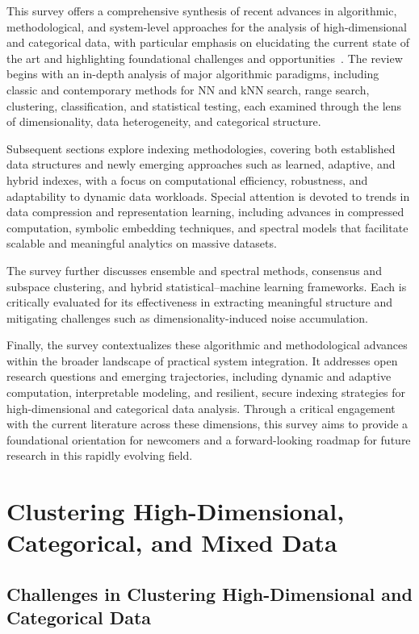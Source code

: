 This survey offers a comprehensive synthesis of recent advances in algorithmic, methodological, and system-level approaches for the analysis of high-dimensional and categorical data, with particular emphasis on elucidating the current state of the art and highlighting foundational challenges and opportunities~\cite{ref116,ref117,ref118}. The review begins with an in-depth analysis of major algorithmic paradigms, including classic and contemporary methods for NN and kNN search, range search, clustering, classification, and statistical testing, each examined through the lens of dimensionality, data heterogeneity, and categorical structure.

Subsequent sections explore indexing methodologies, covering both established data structures and newly emerging approaches such as learned, adaptive, and hybrid indexes, with a focus on computational efficiency, robustness, and adaptability to dynamic data workloads. Special attention is devoted to trends in data compression and representation learning, including advances in compressed computation, symbolic embedding techniques, and spectral models that facilitate scalable and meaningful analytics on massive datasets.

The survey further discusses ensemble and spectral methods, consensus and subspace clustering, and hybrid statistical--machine learning frameworks. Each is critically evaluated for its effectiveness in extracting meaningful structure and mitigating challenges such as dimensionality-induced noise accumulation.

Finally, the survey contextualizes these algorithmic and methodological advances within the broader landscape of practical system integration. It addresses open research questions and emerging trajectories, including dynamic and adaptive computation, interpretable modeling, and resilient, secure indexing strategies for high-dimensional and categorical data analysis. Through a critical engagement with the current literature across these dimensions, this survey aims to provide a foundational orientation for newcomers and a forward-looking roadmap for future research in this rapidly evolving field.

\section{Clustering High-Dimensional, Categorical, and Mixed Data}

\subsection{Challenges in Clustering High-Dimensional and Categorical Data}

